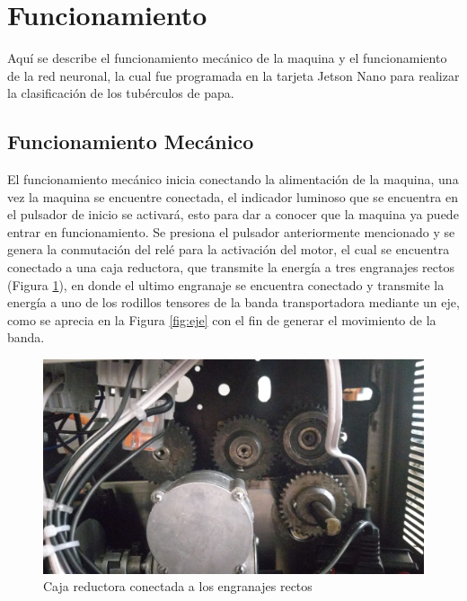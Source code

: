 	\section{Funcionamiento}
	Aquí se describe el funcionamiento mecánico de la maquina y el funcionamiento de la red neuronal, la cual fue programada en la tarjeta Jetson Nano para realizar la clasificación de los tubérculos de papa.
	
	\subsection{Funcionamiento Mecánico}
		El funcionamiento mecánico inicia conectando la alimentación de la maquina, una vez la maquina se encuentre conectada, el indicador luminoso que se encuentra en el pulsador de inicio se activará, esto para dar a conocer que la maquina ya puede entrar en funcionamiento. Se presiona el pulsador anteriormente mencionado y se genera la conmutación del relé para la activación del motor, el cual se encuentra conectado a una caja reductora, que transmite la energía a tres engranajes rectos (Figura \ref{fig:caja}), en donde el ultimo engranaje se encuentra conectado y transmite la energía a uno de los rodillos tensores de la banda transportadora mediante un eje, como se aprecia en la Figura \ref{fig:eje} con el fin de generar el movimiento de la banda. 
		
\newpage	
		\begin{figure}[ht]
			\centering
			\includegraphics[scale=0.21]{Figs/201.jpg}
			\caption{Caja reductora conectada a los engranajes rectos}
			\label{fig:caja}
		\end{figure}
	
